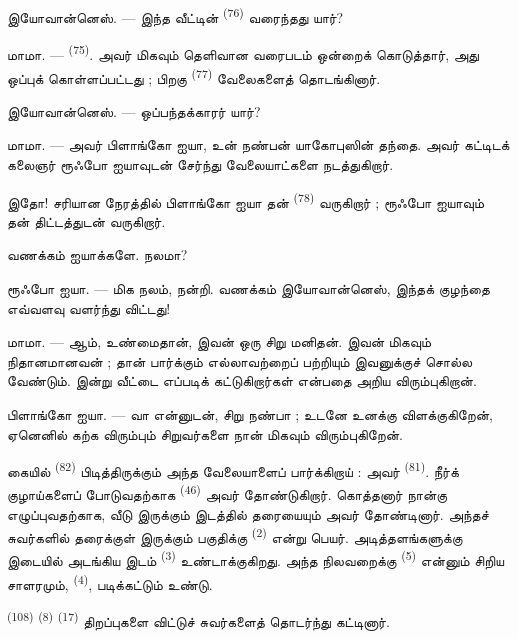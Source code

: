 \textsc{இயோவான்னெஸ்}. --- இந்த வீட்டின் 
\textsuperscript{(76)} வரைந்தது யார்?

\textsc{மாமா}. ---  \textsuperscript{(75)}. அவர்
மிகவும் தெளிவான வரைபடம் ஒன்றைக் கொடுத்தார், அது ஒப்புக் கொள்ளப்பட்டது ;
பிறகு  \textsuperscript{(77)} வேலைகளைத் தொடங்கினார்.

\textsc{இயோவான்னெஸ்}. --- ஒப்பந்தக்காரர் யார்?

\textsc{மாமா}. --- அவர் பிளாங்கோ ஐயா, உன் நண்பன் யாகோபுஸின் தந்தை. அவர்
கட்டிடக் கலைஞர் ரூஃபோ ஐயாவுடன் சேர்ந்து வேலையாட்களை நடத்துகிறார்.

இதோ! சரியான நேரத்தில் பிளாங்கோ ஐயா தன் 
\textsuperscript{(78)} வருகிறார் ; ரூஃபோ ஐயாவும் தன் திட்டத்துடன் வருகிறார்.

வணக்கம் ஐயாக்களே. நலமா?

\textsc{ரூஃபோ ஐயா}. --- மிக நலம், நன்றி. வணக்கம் இயோவான்னெஸ், இந்தக்
குழந்தை எவ்வளவு வளர்ந்து விட்டது!

\textsc{மாமா}. --- ஆம், உண்மைதான், இவன் ஒரு சிறு மனிதன். இவன் மிகவும்
நிதானமானவன் ; தான் பார்க்கும் எல்லாவற்றைப் பற்றியும் இவனுக்குச் சொல்ல
வேண்டும். இன்று வீட்டை எப்படிக் கட்டுகிறார்கள் என்பதை அறிய
விரும்புகிறான்.

\VUsaut{3.0mm}

\textsc{பிளாங்கோ ஐயா}. --- வா என்னுடன், சிறு நண்பா ; உடனே உனக்கு
விளக்குகிறேன், ஏனெனில் கற்க விரும்பும் சிறுவர்களை நான் மிகவும்
விரும்புகிறேன்.

கையில்  \textsuperscript{(82)} பிடித்திருக்கும் அந்த
வேலையாளைப் பார்க்கிறாய் : அவர் 
\textsuperscript{(81)}. நீர்க் குழாய்களைப் போடுவதற்காக 
\textsuperscript{(46)} அவர் தோண்டுகிறார். கொத்தனார் நான்கு 
எழுப்புவதற்காக, வீடு இருக்கும் இடத்தில் தரையையும் அவர் தோண்டினார். அந்தச்
சுவர்களில் தரைக்குள் இருக்கும் பகுதிக்கு 
\textsuperscript{(2)} என்று பெயர். அடித்தளங்களுக்கு இடையில் அடங்கிய
இடம்  \textsuperscript{(3)} உண்டாக்குகிறது. அந்த
நிலவறைக்கு  \textsuperscript{(5)} என்னும் சிறிய
சாளரமும்,  \textsuperscript{(4)}, படிக்கட்டும் உண்டு.

 \textsuperscript{(108)} 
\textsuperscript{(8)}  \textsuperscript{(17)}
திறப்புகளை விட்டுச் சுவர்களைத் தொடர்ந்து கட்டினார்.

